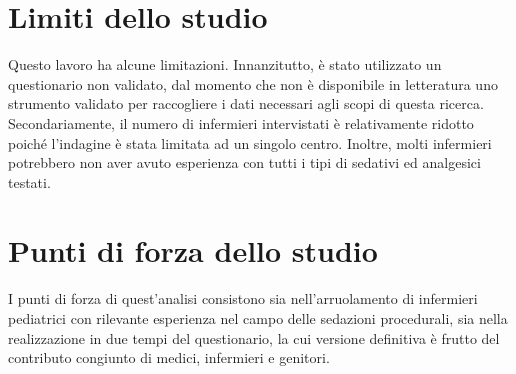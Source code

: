 
\section{Limiti dello studio}
Questo lavoro ha alcune limitazioni. Innanzitutto, è stato utilizzato un questionario non validato, dal momento che non è disponibile in letteratura uno strumento validato per raccogliere i dati necessari agli scopi di questa ricerca. Secondariamente, il numero di infermieri intervistati è relativamente ridotto poiché l'indagine è stata limitata ad un singolo centro. Inoltre, molti infermieri potrebbero non aver avuto esperienza con tutti i tipi di sedativi ed analgesici testati. 

\section{Punti di forza dello studio}
I punti di forza di quest'analisi consistono sia nell'arruolamento di infermieri pediatrici con rilevante esperienza nel campo delle sedazioni procedurali, sia nella realizzazione in due tempi del questionario, la cui versione definitiva è frutto del contributo congiunto di medici, infermieri e genitori. 